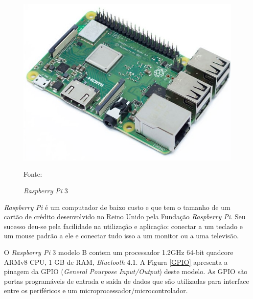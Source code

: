 \documentclass[
12pt,
openany, %
oneside, %
a4paper,			
english,			
brazil			        %
]{abntbibufjf}
\begin{document}
    \begin{figure}[!htb]
		\centering
		\includegraphics[scale=0.45]{Figuras/raspberry.jpeg}
		\caption{\textit{Raspberry Pi} 3}
		\label{raspberry}
		\par Fonte: \cite{FLOP}
	\end{figure}
    
    \textit{Raspberry Pi} é um computador de baixo custo e que tem o tamanho de um cartão de crédito desenvolvido no Reino Unido pela Fundação \textit{Raspberry Pi}. Seu sucesso deu-se pela facilidade na utilização e aplicação: conectar a um teclado e um mouse padrão a ele e conectar tudo isso a um monitor ou a uma televisão.
    
    O \textit{Raspberry Pi} 3 modelo B contem um processador 1.2GHz 64-bit quadcore ARMv8 CPU, 1 GB de RAM, \textit{Bluetooth} 4.1. A Figura \ref{GPIO} apresenta a pinagem da GPIO (\textit{General Pourpose Input/Output}) deste modelo. As GPIO são portas programáveis de entrada e saída de dados que são utilizadas para interface entre os periféricos e um microprocessador/microcontrolador.
    
\end{document}
